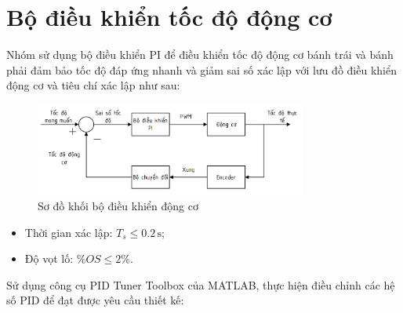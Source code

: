      \section{Bộ điều khiển tốc độ động cơ}
          \hspace*{0.6cm}Nhóm sử dụng bộ điều khiển PI để điều khiển tốc độ động cơ bánh trái và bánh phải
          đảm bảo tốc độ đáp ứng nhanh và giảm sai số xác lập với lưu đồ điều khiển động
          cơ và tiêu chí xác lập như sau:
               \begin{figure}[H]
                    \centering
                    \includegraphics[width=0.8\textwidth]{pictures/chapter6/PI_controller.png}
                    \caption{Sơ đồ khối bộ điều khiển động cơ}
                    \label{PI_controller}
               \end{figure}
          \begin{itemize}
               \item Thời gian xác lập: $T_s \leq 0.2 \,\mathrm{s}$;
               \item Độ vọt lố: $\%OS \leq 2 \%$.
          \end{itemize}
          \hspace*{0.6cm}Sử dụng công cụ PID Tuner Toolbox của MATLAB, thực hiện điều chỉnh các hệ số PID để đạt được yêu cầu thiết kế:
